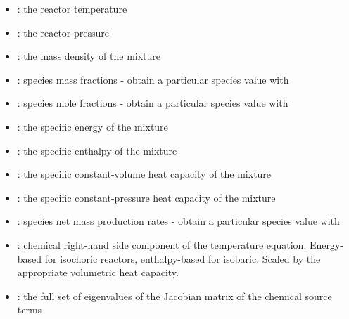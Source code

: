 \documentclass[letterpaper,10pt,english]{sphinxmanual}
\begin{document}
\begin{itemize}
\item {} 
: the reactor temperature

\item {} 
: the reactor pressure

\item {} 
: the mass density of the mixture

\item {} 
: species mass fractions - obtain a particular species value with 

\item {} 
: species mole fractions - obtain a particular species value with 

\item {} 
: the specific energy of the mixture

\item {} 
: the specific enthalpy of the mixture

\item {} 
: the specific constant-volume heat capacity of the mixture

\item {} 
: the specific constant-pressure heat capacity of the mixture

\item {} 
: species net mass production rates - obtain a particular species value with 

\item {} 
: chemical right-hand side component of the temperature equation. Energy-based for isochoric reactors, enthalpy-based for isobaric. Scaled by the appropriate volumetric heat capacity.

\item {} 
: the full set of eigenvalues of the Jacobian matrix of the chemical source terms

\end{itemize}
\end{document}
